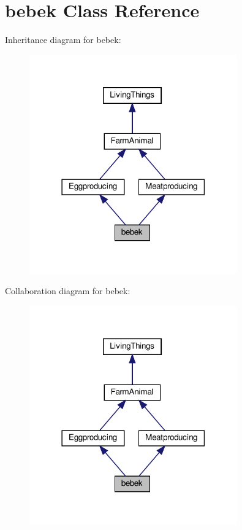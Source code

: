 \hypertarget{classbebek}{}\section{bebek Class Reference}
\label{classbebek}


Inheritance diagram for bebek\+:
\nopagebreak
\begin{figure}[H]
\begin{center}
\leavevmode
\includegraphics[width=254pt]{classbebek__inherit__graph}
\end{center}
\end{figure}


Collaboration diagram for bebek\+:
\nopagebreak
\begin{figure}[H]
\begin{center}
\leavevmode
\includegraphics[width=254pt]{classbebek__coll__graph}
\end{center}
\end{figure}
